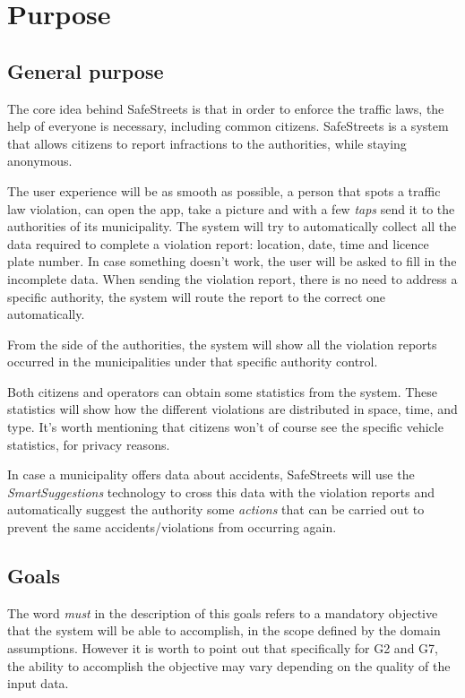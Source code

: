 \section{Purpose}
\subsection{General purpose}
The core idea behind SafeStreets is that in order to enforce the traffic laws,
the help of everyone is necessary, including common citizens.
SafeStreets is a system that allows citizens to report infractions to the
authorities, while staying anonymous.

The user experience will be as smooth as possible, a person that spots a
traffic law violation, can open the app, take a picture and with a few
\emph{taps} send it to the authorities of its municipality.
The system will try to automatically collect all the data required to complete
a violation report: location, date, time and licence plate number. In case
something doesn't work, the user will be asked to fill in the incomplete data.
When sending the violation report, there is no need to address a specific
authority, the system will route the report to the correct one automatically.

From the side of the authorities, the system will show all the violation reports
occurred in the municipalities under that specific authority control.

Both citizens and operators can obtain some statistics from the system. These
statistics will show how the different violations are distributed in space, time,
and type. It's worth mentioning that citizens won't of course see the specific
vehicle statistics, for privacy reasons.

In case a municipality offers data about accidents, SafeStreets will use the
\emph{SmartSuggestions} technology to cross this data with the violation 
reports and automatically suggest the authority some \emph{actions} that can be
carried out to prevent the same accidents/violations from occurring again.

\subsection{Goals}

\begin{description}
\end{description}

\noindent
The word \emph{must} in the description of this goals refers to a mandatory
objective that the system will be able to accomplish, in the scope defined
by the domain assumptions.
However it is worth to point out that specifically for G2 and G7,
the ability to accomplish the objective may vary depending on the
quality of the input data.